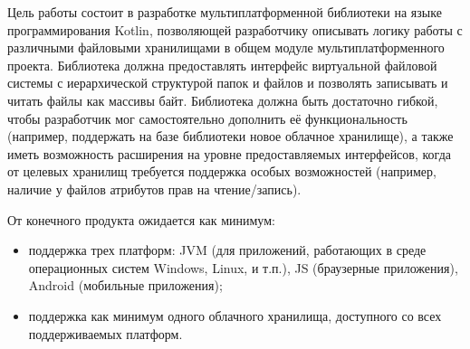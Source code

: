 
Цель работы состоит в разработке мультиплатформенной библиотеки на языке программирования Kotlin, позволяющей разработчику описывать логику работы с различными файловыми хранилищами в общем модуле мультиплатформенного проекта. Библиотека должна предоставлять интерфейс виртуальной файловой системы с иерархической структурой папок и файлов и позволять записывать и читать файлы как массивы байт. Библиотека должна быть достаточно гибкой, чтобы разработчик мог самостоятельно дополнить её функциональность (например, поддержать на базе библиотеки новое облачное хранилище), а также иметь возможность расширения на уровне предоставляемых интерфейсов, когда от целевых хранилищ требуется поддержка особых возможностей (например, наличие у файлов атрибутов прав на чтение/запись). 

От конечного продукта ожидается как минимум:
\begin{itemize}
    \item поддержка трех платформ: JVM (для приложений, работающих в среде операционных систем Windows, Linux, и т.п.), JS (браузерные приложения), Android (мобильные приложения);
    \item поддержка как минимум одного облачного хранилища, доступного со всех поддерживаемых платформ.
\end{itemize}


